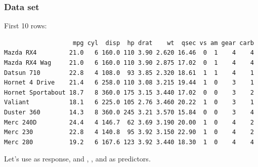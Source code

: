 \documentclass[12pt]{beamer}\usepackage[]{graphicx}\usepackage[]{color}
\makeatletter
\newcommand{\hlcom}[1]{\textcolor[rgb]{0.678,0.584,0.686}{\textit{#1}}}%
\newcommand{\hlopt}[1]{\textcolor[rgb]{0,0,0}{#1}}%
\newcommand{\hlstd}[1]{\textcolor[rgb]{0.345,0.345,0.345}{#1}}%
\newcommand{\hlkwb}[1]{\textcolor[rgb]{0.69,0.353,0.396}{#1}}%
\newcommand{\hlkwd}[1]{\textcolor[rgb]{0.737,0.353,0.396}{\textbf{#1}}}%
\newenvironment{kframe}{%
 \def\at@end@of@kframe{}%
 \ifinner\ifhmode%
  \def\at@end@of@kframe{\end{minipage}}%
  \begin{minipage}{\columnwidth}%
 \fi\fi%
 \def\FrameCommand##1{\hskip\@totalleftmargin \hskip-\fboxsep
 \colorbox{shadecolor}{##1}\hskip-\fboxsep
     \hskip-\linewidth \hskip-\@totalleftmargin \hskip\columnwidth}%
 \MakeFramed {\advance\hsize-\width
   \@totalleftmargin\z@ \linewidth\hsize
   \@setminipage}}%
 {\par\unskip\endMakeFramed%
 \at@end@of@kframe}
\newenvironment{knitrout}{}{} %
\makeatother
\begin{document}
\begin{frame}
\begin{center}
\Huge{}
\end{center}
\end{frame}


\begin{frame}[fragile]
\frametitle{Data set }

First 10 rows:
\begin{knitrout}\scriptsize
{}\color{fgcolor}\begin{kframe}
\begin{verbatim}
                   mpg cyl  disp  hp drat    wt  qsec vs am gear carb
Mazda RX4         21.0   6 160.0 110 3.90 2.620 16.46  0  1    4    4
Mazda RX4 Wag     21.0   6 160.0 110 3.90 2.875 17.02  0  1    4    4
Datsun 710        22.8   4 108.0  93 3.85 2.320 18.61  1  1    4    1
Hornet 4 Drive    21.4   6 258.0 110 3.08 3.215 19.44  1  0    3    1
Hornet Sportabout 18.7   8 360.0 175 3.15 3.440 17.02  0  0    3    2
Valiant           18.1   6 225.0 105 2.76 3.460 20.22  1  0    3    1
Duster 360        14.3   8 360.0 245 3.21 3.570 15.84  0  0    3    4
Merc 240D         24.4   4 146.7  62 3.69 3.190 20.00  1  0    4    2
Merc 230          22.8   4 140.8  95 3.92 3.150 22.90  1  0    4    2
Merc 280          19.2   6 167.6 123 3.92 3.440 18.30  1  0    4    4
\end{verbatim}
\end{kframe}
\end{knitrout}

Let's use  as response, and , , and 
as predictors.

\end{frame}


\end{document}
